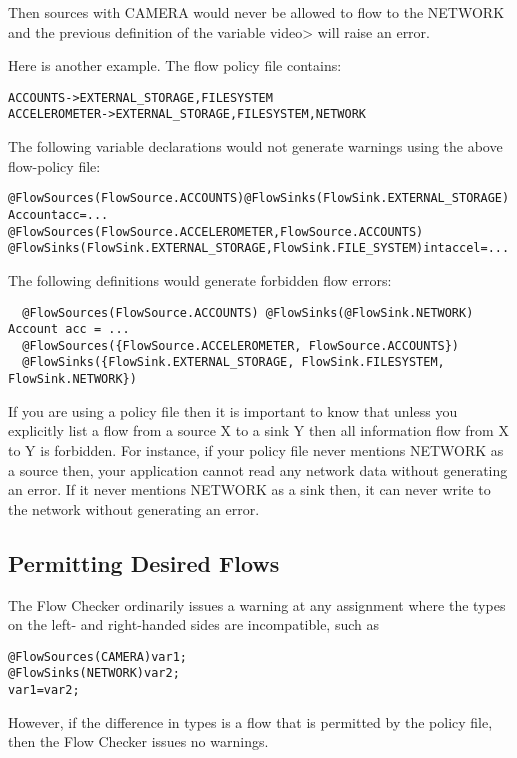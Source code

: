 Then sources with CAMERA would never be allowed to flow to the 
NETWORK and the previous definition of the variable \<video> will raise an error.

Here is another example.
The  flow policy file contains:
\begin{alltt}
  ACCOUNTS      -> EXTERNAL_STORAGE, FILESYSTEM
  ACCELEROMETER -> EXTERNAL_STORAGE, FILESYSTEM, NETWORK
\end{alltt}

The following variable declarations would not generate warnings using the above flow-policy file:
\begin{alltt}
  @FlowSources(FlowSource.ACCOUNTS) @FlowSinks(FlowSink.EXTERNAL_STORAGE) Account acc = ...
  @FlowSources({FlowSource.ACCELEROMETER, FlowSource.ACCOUNTS})
  @FlowSinks({FlowSink.EXTERNAL_STORAGE, FlowSink.FILE_SYSTEM}) int accel = ...
\end{alltt}

The following definitions would generate forbidden flow errors:
\begin{Verbatim}
  @FlowSources(FlowSource.ACCOUNTS) @FlowSinks(@FlowSink.NETWORK) Account acc = ...
  @FlowSources({FlowSource.ACCELEROMETER, FlowSource.ACCOUNTS})
  @FlowSinks({FlowSink.EXTERNAL_STORAGE, FlowSink.FILESYSTEM, FlowSink.NETWORK})
\end{Verbatim}

If you are using a policy file then it is important to know that unless
you explicitly list a flow from a source X to a sink Y then all
information flow from X to Y is forbidden.  For instance,
if  your policy file never mentions NETWORK as a source then, your application
cannot read any network data without generating an error.  If it never
mentions NETWORK as a sink then, it can never write to the network without
generating an error.



\subsection{Permitting Desired Flows}

The Flow Checker ordinarily issues a warning at any assignment where the types on the left- and right-handed sides are incompatible, such as
\begin{alltt}
@FlowSources(CAMERA) var1;
@FlowSinks(NETWORK) var2;
var1=var2;
\end{alltt}
However, if the difference in types is a flow that is permitted by the policy file, then the Flow Checker
issues no warnings.

